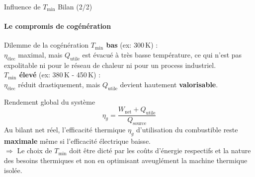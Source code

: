 \documentclass[aspectratio=43, 10pt]{beamer}
\newcommand{\Tmin}{T_{\min}}
\newcommand{\Wnet}{W_{\text{net}}}
\begin{document}
\begin{frame}{\texorpdfstring{Influence de $\Tmin$ \textemdash{} Bilan (2/2)}{Influence de Tmin - Bilan (2/2)}}
  \framesubtitle{Le compromis de cog\'en\'eration}

  \begin{alertblock}{Dilemme de la cog\'en\'eration}
    \normalsize
    \textbf{$\Tmin$ bas} (ex: 300\,K) :\\[2pt]
    $\eta_{\text{\'elec}}$ maximal, mais $Q_\text{utile}$ est \'evacu\'e \`a tr\`es basse temp\'erature, ce qui n'est pas expolitable ni pour le r\'eseau de chaleur ni pour un process industriel.\\[8pt]
    \textbf{$\Tmin$ \'elev\'e} (ex: 380\,K - 450\,K) :\\[2pt]
    $\eta_{\text{\'elec}}$ r\'eduit drastiquement, mais $Q_\text{utile}$ devient hautement \textbf{valorisable}.
  \end{alertblock}

  \begin{exampleblock}{Rendement global du syst\`eme}
    \[
      \eta_g = \frac{\Wnet + Q_{\text{utile}}}{Q_{\text{source}}}
    \]
    \small
    Au bilant net r\'eel, l'efficacit\'e thermique $\eta_g$ d'utilisation du combustible reste \textbf{maximale} m\^eme si l'efficacit\'e \'electrique baisse.\\[4pt]
    $\Rightarrow$ Le choix de $\Tmin$ doit \^etre dict\'e par les co\^uts d'\'energie respectifs et la nature des besoins thermiques et non en optimisant aveugl\'ement la machine thermique isol\'ee.
  \end{exampleblock}

\end{frame}
\diapobilaniv


\end{document}
